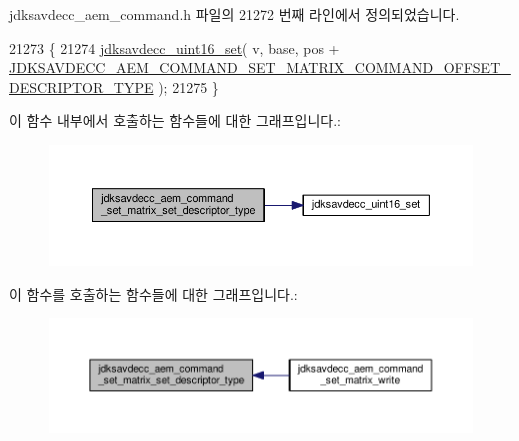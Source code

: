 jdksavdecc\+\_\+aem\+\_\+command.\+h 파일의 21272 번째 라인에서 정의되었습니다.


\begin{DoxyCode}
21273 \{
21274     \hyperlink{group__endian_ga14b9eeadc05f94334096c127c955a60b}{jdksavdecc\_uint16\_set}( v, base, pos + 
      \hyperlink{group__command__set__matrix_gad2f7cf583a047cf627bb5878eb55fad4}{JDKSAVDECC\_AEM\_COMMAND\_SET\_MATRIX\_COMMAND\_OFFSET\_DESCRIPTOR\_TYPE}
       );
21275 \}
\end{DoxyCode}


이 함수 내부에서 호출하는 함수들에 대한 그래프입니다.\+:
\nopagebreak
\begin{figure}[H]
\begin{center}
\leavevmode
\includegraphics[width=350pt]{group__command__set__matrix_gad41fa222412ebec9411b38e8c60fede5_cgraph}
\end{center}
\end{figure}




이 함수를 호출하는 함수들에 대한 그래프입니다.\+:
\nopagebreak
\begin{figure}[H]
\begin{center}
\leavevmode
\includegraphics[width=350pt]{group__command__set__matrix_gad41fa222412ebec9411b38e8c60fede5_icgraph}
\end{center}
\end{figure}


